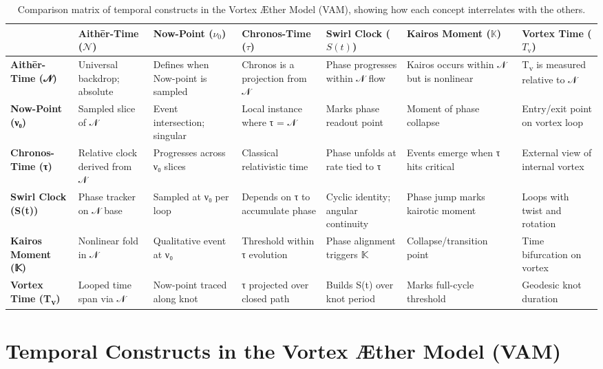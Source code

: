 \documentclass[a4paper,12pt]{article}
\begin{document}
    \begin{table}
        \centering
        \scriptsize
        \begin{tabular}{|l|l|l|l|l|l|l|}
            \hline
            \textbf{} & \textbf{Aithēr-Time} (\(\mathcal{N}\)) & \textbf{Now-Point} (\(\nu_0\)) & \textbf{Chronos-Time} (\(\tau\)) & \textbf{Swirl Clock} (\(S(t)\)) & \textbf{Kairos Moment} (\(\mathbb{K}\)) & \textbf{Vortex Time} (\(T_\text{v}\)) \\
            \hline
            \textbf{Aithēr-Time (𝒩)} & Universal backdrop; absolute & Defines when Now-point is sampled & Chronos is a projection from 𝒩 & Phase progresses within 𝒩 flow & Kairos occurs within 𝒩 but is nonlinear & T\textsubscript{v} is measured relative to 𝒩 \\
            \hline
            \textbf{Now-Point (ν₀)} & Sampled slice of 𝒩 & Event intersection; singular & Local instance where τ = 𝒩 & Marks phase readout point & Moment of phase collapse & Entry/exit point on vortex loop \\
            \hline
            \textbf{Chronos-Time (τ)} & Relative clock derived from 𝒩 & Progresses across ν₀ slices & Classical relativistic time & Phase unfolds at rate tied to τ & Events emerge when τ hits critical & External view of internal vortex \\
            \hline
            \textbf{Swirl Clock (S(t))} & Phase tracker on 𝒩 base & Sampled at ν₀ per loop & Depends on τ to accumulate phase & Cyclic identity; angular continuity & Phase jump marks kairotic moment & Loops with twist and rotation \\
            \hline
            \textbf{Kairos Moment (𝕂)} & Nonlinear fold in 𝒩 & Qualitative event at ν₀ & Threshold within τ evolution & Phase alignment triggers 𝕂 & Collapse/transition point & Time bifurcation on vortex \\
            \hline
            \textbf{Vortex Time (T\textsubscript{v})} & Looped time span via 𝒩 & Now-point traced along knot & τ projected over closed path & Builds S(t) over knot period & Marks full-cycle threshold & Geodesic knot duration \\
            \hline
        \end{tabular}
        \caption{Comparison matrix of temporal constructs in the Vortex Æther Model (VAM), showing how each concept interrelates with the others.}
    \end{table}
    \section*{Temporal Constructs in the Vortex Æther Model (VAM)}
\end{document}
